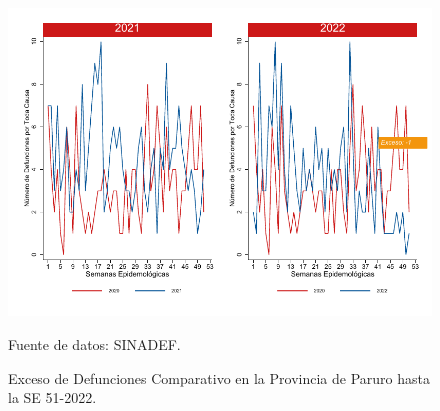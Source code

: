 \documentclass[12pt,a4paper,openany]{book}
\begin{document}
	\begin{figure}[h]
		\caption{Exceso de Defunciones Comparativo en la Provincia de Paruro hasta la SE 51-2022.}\label{fig:exceso_paruro}
		\begin{center}
			\includegraphics[width=0.7\linewidth]{../figuras/exceso_10.pdf}
		\end{center}
		{\footnotesize {Fuente de datos: SINADEF.}}
	\end{figure}
	
	
	\clearpage
	
\end{document}
